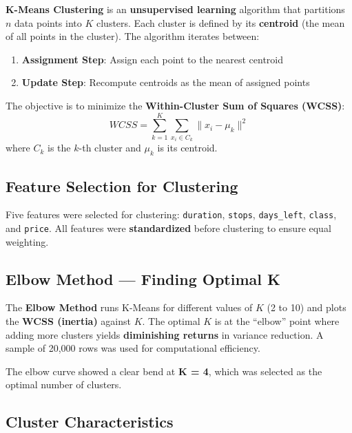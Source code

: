 \documentclass[12pt, a4paper]{article}
\begin{document}
\begin{keyterm}
\textbf{K-Means Clustering} is an \textbf{unsupervised learning} algorithm that partitions $n$ data points into $K$ clusters. Each cluster is defined by its \textbf{centroid} (the mean of all points in the cluster). The algorithm iterates between:
\begin{enumerate}
    \item \textbf{Assignment Step}: Assign each point to the nearest centroid
    \item \textbf{Update Step}: Recompute centroids as the mean of assigned points
\end{enumerate}
The objective is to minimize the \textbf{Within-Cluster Sum of Squares (WCSS)}:
\[
    WCSS = \sum_{k=1}^{K}\sum_{x_i \in C_k} \|x_i - \mu_k\|^2
\]
where $C_k$ is the $k$-th cluster and $\mu_k$ is its centroid.
\end{keyterm}

\subsection{Feature Selection for Clustering}

Five features were selected for clustering: \texttt{duration}, \texttt{stops}, \texttt{days\_left}, \texttt{class}, and \texttt{price}. All features were \textbf{standardized} before clustering to ensure equal weighting.

\subsection{Elbow Method — Finding Optimal K}

\begin{keyterm}
The \textbf{Elbow Method} runs K-Means for different values of $K$ (2 to 10) and plots the \textbf{WCSS (inertia)} against $K$. The optimal $K$ is at the ``elbow'' point where adding more clusters yields \textbf{diminishing returns} in variance reduction. A sample of 20,000 rows was used for computational efficiency.
\end{keyterm}

The elbow curve showed a clear bend at \textbf{K = 4}, which was selected as the optimal number of clusters.

\subsection{Cluster Characteristics}
\end{document}

